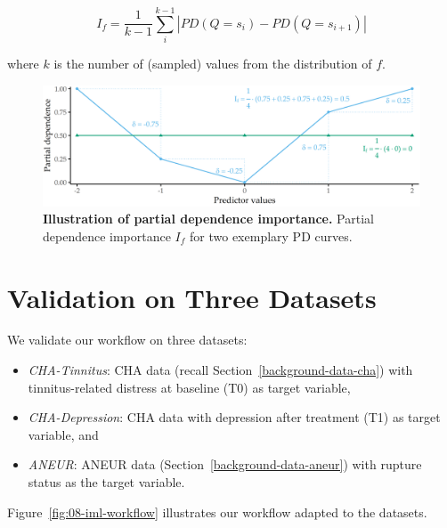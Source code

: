 \documentclass[
  oneside]{book}
\providecommand{\tightlist}{%
  \setlength{\itemsep}{0pt}\setlength{\parskip}{0pt}}
\begin{document}
\begin{equation}
I_f = \frac{1}{k-1}\sum_{i}^{k-1} |PD(Q=s_i) - PD(Q=s_{i+1})|
\label{eq:pdp-imp}
\end{equation}

where \(k\) is the number of (sampled) values from the distribution of \(f\).



\begin{figure}[htb]

{\centering \includegraphics[width=1\linewidth]{figures/08-pd-intro-2} 

}

\caption{\textbf{Illustration of partial dependence importance.} Partial dependence importance \(I_f\) for two exemplary PD curves.}\label{fig:08-pd-intro-2}
\end{figure}

\hypertarget{iml-validation}{%
\section{Validation on Three Datasets}\label{iml-validation}}

We validate our workflow on three datasets:

\begin{itemize}
\tightlist
\item
  \emph{CHA-Tinnitus}: CHA data (recall Section~\ref{background-data-cha}) with tinnitus-related distress at baseline (T0) as target variable,
\item
  \emph{CHA-Depression}: CHA data with depression after treatment (T1) as target variable, and
\item
  \emph{ANEUR}: ANEUR data (Section~\ref{background-data-aneur}) with rupture status as the target variable.
\end{itemize}

Figure~\ref{fig:08-iml-workflow} illustrates our workflow adapted to the datasets.
\end{document}
